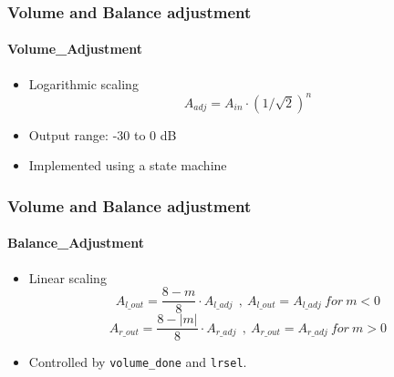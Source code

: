 \begin{frame}
	\frametitle{Volume and Balance adjustment}
	\framesubtitle{Volume\_Adjustment}

	\begin{itemize}
		\item Logarithmic scaling $$A_{adj} = A_{in} \cdot (1/\sqrt{2})^n$$
		\item Output range: -30 to 0 dB
		\item Implemented using a state machine
	\end{itemize}	
	
\end{frame}

\begin{frame}
	\frametitle{Volume and Balance adjustment}
	\framesubtitle{Balance\_Adjustment}
	
	\begin{itemize}
		\item Linear scaling $$A_{l\_out} = \frac{8 - m}{8} \cdot A_{l\_adj}\ \ ,\ A_{l\_out} = A_{l\_adj}\ for\ m < 0$$ $$A_{r\_out} = \frac{8 - |m|}{8} \cdot A_{r\_adj}\ \ ,\ A_{r\_out} = A_{r\_adj}\ for\ m > 0$$
		\item Controlled by \texttt{volume\_done} and \texttt{lrsel}.
	\end{itemize}
	
\end{frame}


%	

